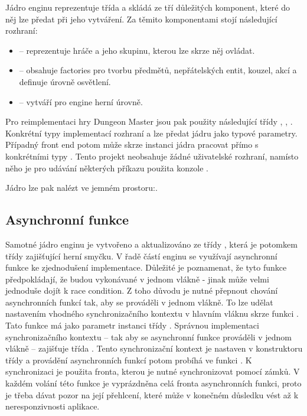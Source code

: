 Jádro enginu reprezentuje třída  a skládá ze tří důležitých komponent, které do něj lze předat při jeho vytváření. 
Za těmito komponentami stojí následující rozhraní:

\begin{itemize}
\item {} -- reprezentuje hráče a jeho skupinu, kterou lze skrze něj ovládat.
\item {} -- obsahuje factories pro tvorbu předmětů, nepřátelských entit, kouzel, akcí a definuje úrovně osvětlení.
\item {} -- vytváří pro engine herní úrovně.
\end{itemize}


Pro reimplementaci hry Dungeon Master jsou pak použity následující třídy ,
, . Konkrétní typy implementací rozhraní
 a  lze předat jádru jako typové parametry.
Případný front end potom může skrze instanci jádra pracovat přímo s konkrétními typy . Tento projekt
neobsahuje žádné uživatelské rozhraní, namísto něho je pro udávání některých příkazu použita konzole .

Jádro lze pak nalézt ve jemném prostoru:\newline {}.



\subsection{Asynchronní funkce}\label{async-engine}

Samotné jádro enginu je vytvořeno a aktualizováno ze třídy , která je potomkem třídy  zajišťující herní smyčku.
V řadě částí enginu se využívají asynchronní funkce ke zjednodušení implementace. Důležité je 
poznamenat, že tyto funkce předpokládají, že budou vykonávané v jednom vlákně - jinak může velmi jednoduše dojít k race condition.
Z toho důvodu je nutné přepnout chování asynchronních funkcí tak, aby se prováděli v jednom vlákně. To lze udělat nastavením 
vhodného synchronizačního kontextu v hlavním vláknu skrze funkci . 
Tato funkce má jako parametr instanci třídy . Správnou implementaci synchronizačního kontextu 
-- tak aby se asynchronní funkce prováděli v jednom vlákně -- zajišťuje třída . Tento synchronizační
kontext je nastaven v konstruktoru třídy  a provádění asynchronních funkcí potom probíhá ve funkci .
K synchronizaci je použita fronta, kterou je nutné synchronizovat pomocí zámků.
V každém volání této funkce je vyprázdněna celá fronta asynchronních funkci, proto je třeba dávat pozor na její přehlcení,
které může v konečném důsledku vést až k neresponzivnosti aplikace.


